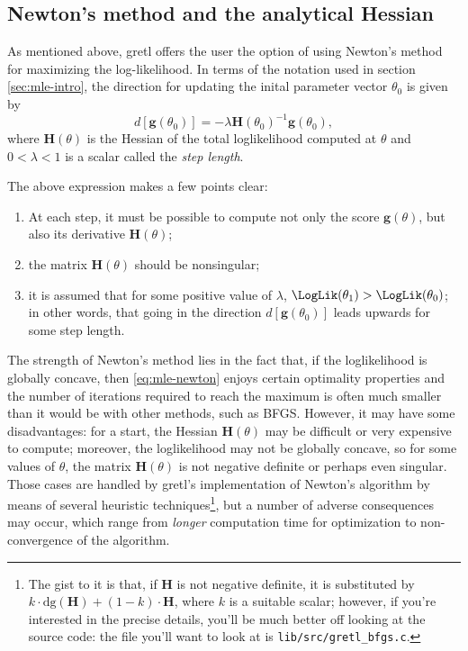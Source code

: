 \subsection{Newton's method and the analytical Hessian}
\label{sec:mle-adv-hessian}

As mentioned above, gretl offers the user the option of using
Newton's method for maximizing the log-likelihood. In terms of the
notation used in section \ref{sec:mle-intro}, the direction for
updating the inital parameter vector $\theta_0$ is given by
\begin{equation}
  \label{eq:mle-newton}
  d\left[\mathbf{g}(\theta_0)\right] = -\lambda
  \mathbf{H}(\theta_0)^{-1}\mathbf{g}(\theta_0) ,
\end{equation}
where $\mathbf{H}(\theta)$ is the Hessian of the total loglikelihood
computed at $\theta$ and $0 < \lambda < 1$ is a scalar called the
\emph{step length}.

The above expression makes a few points clear:
\begin{enumerate}
\item At each step, it must be possible to compute not only the score
  $\mathbf{g}(\theta)$, but also its derivative $\mathbf{H}(\theta)$;
\item the matrix $\mathbf{H}(\theta)$ should be nonsingular;
\item it is assumed that for some positive value of $\lambda$,
  $\LogLik(\theta_1) > \LogLik(\theta_0)$; in other words, that going
  in the direction $d\left[\mathbf{g}(\theta_0)\right]$ leads upwards
  for some step length.
\end{enumerate}

The strength of Newton's method lies in the fact that, if the
loglikelihood is globally concave, then \eqref{eq:mle-newton} enjoys
certain optimality properties and the number of iterations required to
reach the maximum is often much smaller than it would be with other
methods, such as BFGS. However, it may have some disadvantages: for a
start, the Hessian $\mathbf{H}(\theta)$ may be difficult or very
expensive to compute; moreover, the loglikelihood may not be globally
concave, so for some values of $\theta$, the matrix
$\mathbf{H}(\theta)$ is not negative definite or perhaps even
singular.  Those cases are handled by gretl's implementation of
Newton's algorithm by means of several heuristic
techniques\footnote{The gist to it is that, if $\mathbf{H}$ is not
  negative definite, it is substituted by $k \cdot
  \mathrm{dg}(\mathbf{H}) + (1-k) \cdot \mathbf{H}$, where $k$ is a
  suitable scalar; however, if you're interested in the precise
  details, you'll be much better off looking at the source code: the
  file you'll want to look at is \texttt{lib/src/gretl\_bfgs.c}.}, but
a number of adverse consequences may occur, which range from
\emph{longer} computation time for optimization to non-convergence of
the algorithm.

